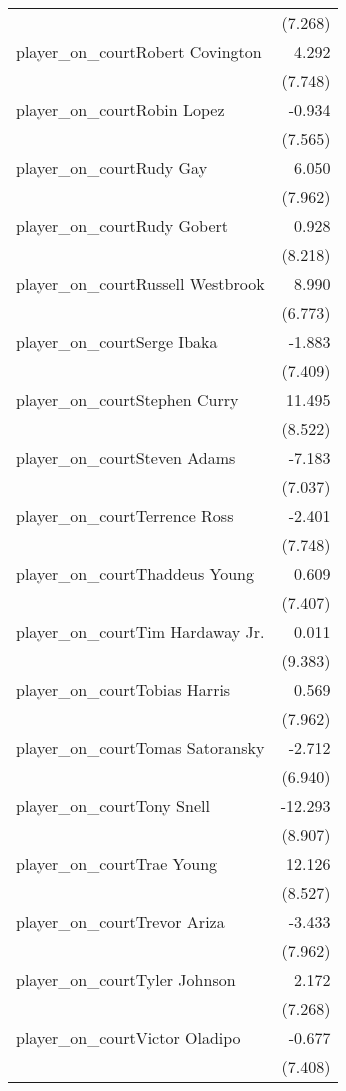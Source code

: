 \documentclass[
  landscape]{article}
\begin{document}
\begin{table}[!htbp]
\begin{tabular}{@{\extracolsep{5pt}}lD{.}{.}{-3} }
  & (7.268) \\ 
  player\_on\_courtRobert Covington & 4.292 \\ 
  & (7.748) \\ 
  player\_on\_courtRobin Lopez & -0.934 \\ 
  & (7.565) \\ 
  player\_on\_courtRudy Gay & 6.050 \\ 
  & (7.962) \\ 
  player\_on\_courtRudy Gobert & 0.928 \\ 
  & (8.218) \\ 
  player\_on\_courtRussell Westbrook & 8.990 \\ 
  & (6.773) \\ 
  player\_on\_courtSerge Ibaka & -1.883 \\ 
  & (7.409) \\ 
  player\_on\_courtStephen Curry & 11.495 \\ 
  & (8.522) \\ 
  player\_on\_courtSteven Adams & -7.183 \\ 
  & (7.037) \\ 
  player\_on\_courtTerrence Ross & -2.401 \\ 
  & (7.748) \\ 
  player\_on\_courtThaddeus Young & 0.609 \\ 
  & (7.407) \\ 
  player\_on\_courtTim Hardaway Jr. & 0.011 \\ 
  & (9.383) \\ 
  player\_on\_courtTobias Harris & 0.569 \\ 
  & (7.962) \\ 
  player\_on\_courtTomas Satoransky & -2.712 \\ 
  & (6.940) \\ 
  player\_on\_courtTony Snell & -12.293 \\ 
  & (8.907) \\ 
  player\_on\_courtTrae Young & 12.126 \\ 
  & (8.527) \\ 
  player\_on\_courtTrevor Ariza & -3.433 \\ 
  & (7.962) \\ 
  player\_on\_courtTyler Johnson & 2.172 \\ 
  & (7.268) \\ 
  player\_on\_courtVictor Oladipo & -0.677 \\ 
  & (7.408) \\ 

\end{tabular}
\end{table}
\end{document}
